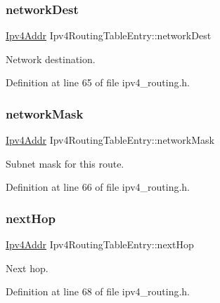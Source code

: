 \subsubsection{\texorpdfstring{network\+Dest}{networkDest}}
{\footnotesize\ttfamily \hyperlink{ipv4_8h_a411debb3d770caa0c06d3f73367da37f}{Ipv4\+Addr} Ipv4\+Routing\+Table\+Entry\+::network\+Dest}



Network destination. 



Definition at line 65 of file ipv4\+\_\+routing.\+h.

\mbox{\label{structIpv4RoutingTableEntry_aac448d5de06b37fb0e4bde56f4f25dcb}} 
\subsubsection{\texorpdfstring{network\+Mask}{networkMask}}
{\footnotesize\ttfamily \hyperlink{ipv4_8h_a411debb3d770caa0c06d3f73367da37f}{Ipv4\+Addr} Ipv4\+Routing\+Table\+Entry\+::network\+Mask}



Subnet mask for this route. 



Definition at line 66 of file ipv4\+\_\+routing.\+h.

\mbox{\label{structIpv4RoutingTableEntry_a3b3ebf0476ac590ebe1d93dfe727fecb}} 
\subsubsection{\texorpdfstring{next\+Hop}{nextHop}}
{\footnotesize\ttfamily \hyperlink{ipv4_8h_a411debb3d770caa0c06d3f73367da37f}{Ipv4\+Addr} Ipv4\+Routing\+Table\+Entry\+::next\+Hop}



Next hop. 



Definition at line 68 of file ipv4\+\_\+routing.\+h.

\mbox{\label{structIpv4RoutingTableEntry_a93b4bd84e83e9f3e0dc9eb71b59708c6}} 
